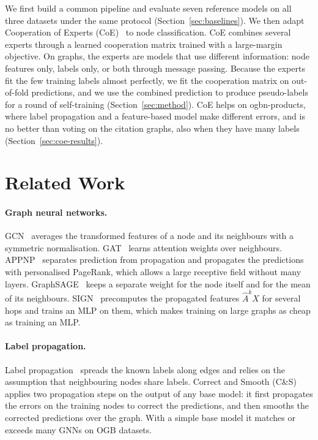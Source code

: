 \documentclass[sigconf,nonacm]{acmart}
\begin{document}
We first build a common pipeline and evaluate seven reference models on all three datasets under the same protocol (Section~\ref{sec:baselines}).
We then adapt Cooperation of Experts (CoE)~\cite{wang2025coe} to node classification.
CoE combines several experts through a learned cooperation matrix trained with a large-margin objective.
On graphs, the experts are models that use different information: node features only, labels only, or both through message passing.
Because the experts fit the few training labels almost perfectly, we fit the cooperation matrix on out-of-fold predictions, and we use the combined prediction to produce pseudo-labels for a round of self-training (Section~\ref{sec:method}).
CoE helps on ogbn-products, where label propagation and a feature-based model make different errors, and is no better than voting on the citation graphs, also when they have many labels (Section~\ref{sec:coe-results}).

\section{Related Work}

\paragraph{Graph neural networks.}
GCN~\cite{kipf2017gcn} averages the transformed features of a node and its neighbours with a symmetric normalisation.
GAT~\cite{velickovic2018gat} learns attention weights over neighbours.
APPNP~\cite{gasteiger2019appnp} separates prediction from propagation and propagates the predictions with personalised PageRank, which allows a large receptive field without many layers.
GraphSAGE~\cite{hamilton2017sage} keeps a separate weight for the node itself and for the mean of its neighbours.
SIGN~\cite{rossi2020sign} precomputes the propagated features $\hat{A}^k X$ for several hops and trains an MLP on them, which makes training on large graphs as cheap as training an MLP.

\paragraph{Label propagation.}
Label propagation~\cite{zhu2002lp,zhou2004lgc} spreads the known labels along edges and relies on the assumption that neighbouring nodes share labels.
Correct and Smooth (C\&S)~\cite{huang2021cs} applies two propagation steps on the output of any base model: it first propagates the errors on the training nodes to correct the predictions, and then smooths the corrected predictions over the graph.
With a simple base model it matches or exceeds many GNNs on OGB datasets.
\end{document}
